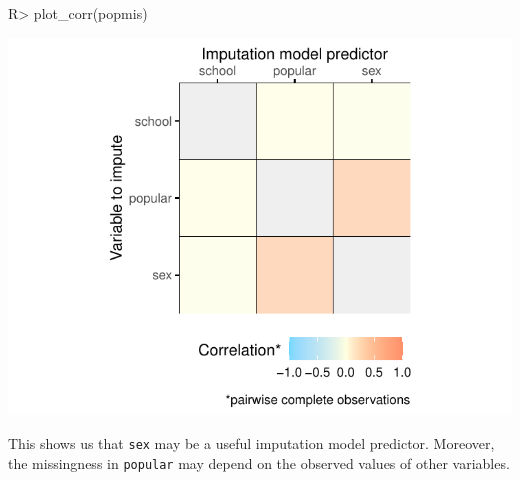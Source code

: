 \documentclass[
]{jss}
\begin{document}
\begin{CodeChunk}
\begin{CodeInput}
R> plot_corr(popmis)
\end{CodeInput}


\begin{center}\includegraphics{Imputation_of_Incomplete_Multilevel_Data_files/figure-latex/pop-corr-1} \end{center}

\end{CodeChunk}

This shows us that \texttt{sex} may be a useful imputation model
predictor. Moreover, the missingness in \texttt{popular} may depend on
the observed values of other variables.
\end{document}
